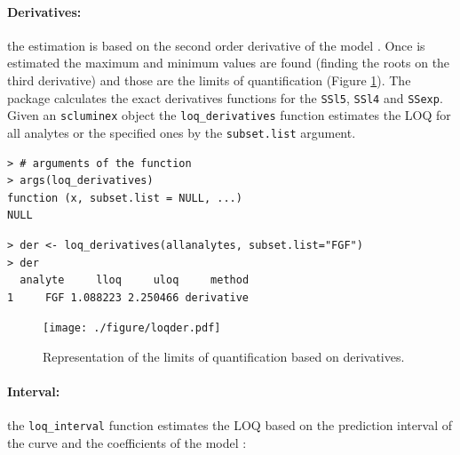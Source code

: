 \documentclass[11pt]{article}\usepackage[]{graphicx}\usepackage[]{color}
\makeatletter
\newenvironment{kframe}{%
 \def\at@end@of@kframe{}%
 \ifinner\ifhmode%
  \def\at@end@of@kframe{\end{minipage}}%
  \begin{minipage}{\columnwidth}%
 \fi\fi%
 \def\FrameCommand##1{\hskip\@totalleftmargin \hskip-\fboxsep
 \colorbox{shadecolor}{##1}\hskip-\fboxsep
     \hskip-\linewidth \hskip-\@totalleftmargin \hskip\columnwidth}%
 \MakeFramed {\advance\hsize-\width
   \@totalleftmargin\z@ \linewidth\hsize
   \@setminipage}}%
 {\par\unskip\endMakeFramed%
 \at@end@of@kframe}
\newenvironment{knitrout}{}{} %
\makeatother
\begin{document}
\paragraph{Derivatives:} the estimation is based on the second order 
derivative of the model \cite{loqder}. Once is estimated the maximum and 
minimum values are found (finding the roots on the third derivative) and 
those are the limits of quantification (Figure \ref{fig:loqder}). The package 
calculates the exact derivatives functions for the {\tt SSl5}, 
{\tt SSl4} and {\tt SSexp}. Given an {\tt scluminex} object the 
{\tt loq\_derivatives} function estimates the LOQ for all analytes 
or the specified ones by the {\tt subset.list} argument.


\begin{knitrout}
\color{fgcolor}\begin{kframe}
\begin{verbatim}
> # arguments of the function
> args(loq_derivatives)
function (x, subset.list = NULL, ...) 
NULL
\end{verbatim}
\end{kframe}
\end{knitrout}


\begin{knitrout}
\color{fgcolor}\begin{kframe}
\begin{verbatim}
> der <- loq_derivatives(allanalytes, subset.list="FGF")
> der
  analyte     lloq     uloq     method
1     FGF 1.088223 2.250466 derivative
\end{verbatim}
\end{kframe}
\end{knitrout}


\begin{figure}[!ht]
\begin{center}
\texttt{[image: ./figure/loqder.pdf]}
\caption{Representation of the limits of quantification based on derivatives.}
\label{fig:loqder}
\end{center}
\end{figure}



\clearpage
\paragraph{Interval:} the {\tt loq\_interval} function estimates the 
LOQ based on the prediction interval of the curve and the coefficients 
of the model \cite{loqint}:
\end{document}
